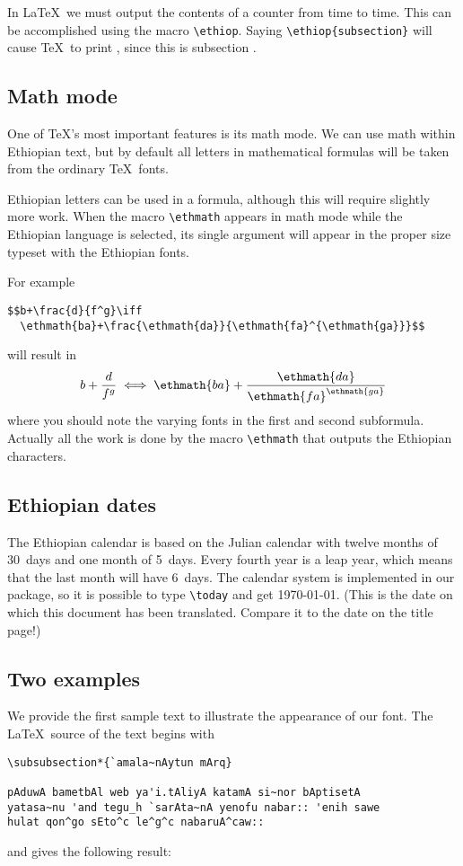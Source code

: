 \documentclass[a4paper]{article}
\newcommand{\eth}{\selectlanguage{ethiop}}
\begin{document}
In \LaTeX\ we must output the contents of a counter
from time to time. This can be accomplished using the
macro \verb|\ethiop|. Saying \verb|\ethiop{subsection}| will
cause \TeX\ to print {\eth{}}, since this
is subsection .


\subsection{Math mode}

One of \TeX's most important features is its math mode.
We can use math within Ethiopian text, but
by default all letters in mathematical formulas will
be taken from the ordinary \TeX\ fonts.

Ethiopian letters can be used in a formula, although this
will require slightly more work. When the macro
\verb|\ethmath| appears in math mode while the
Ethiopian language is selected, its single argument will
appear in the proper size typeset with the Ethiopian fonts.

For example
\begin{verbatim}
$$b+\frac{d}{f^g}\iff
  \ethmath{ba}+\frac{\ethmath{da}}{\ethmath{fa}^{\ethmath{ga}}}$$
\end{verbatim}
will result in
$$b+\frac{d}{f^g}\iff
  \ethmath{ba}+\frac{\ethmath{da}}{\ethmath{fa}^{\ethmath{ga}}}$$
%
where you should note the varying fonts in the first and second
subformula. Actually all the work is done by the macro
\verb|\ethmath| that outputs the Ethiopian characters.


\subsection{Ethiopian dates}

The Ethiopian calendar is based on the Julian calendar with
twelve months of 30~days and one month of 5~days. Every fourth
year is a leap year, which means that the last month will have
6~days. The calendar system is implemented in our package,
so it is possible to type \verb|\today| and get {\eth\today}.
(This is the date on which this document has
been translated. Compare it to the date on the title page!)


\subsection{Two examples}

We provide the first sample text to illustrate the appearance of
our font. The \LaTeX\ source of the text begins with
\begin{verbatim}
\subsubsection*{`amala~nAytun mArq}

pAduwA bametbAl web ya'i.tAliyA katamA si~nor bAptisetA 
yatasa~nu 'and tegu_h `sarAta~nA yenofu nabar:: 'enih sawe 
hulat qon^go sEto^c le^g^c nabaruA^caw::
\end{verbatim}
and gives the following result:
\end{document}
